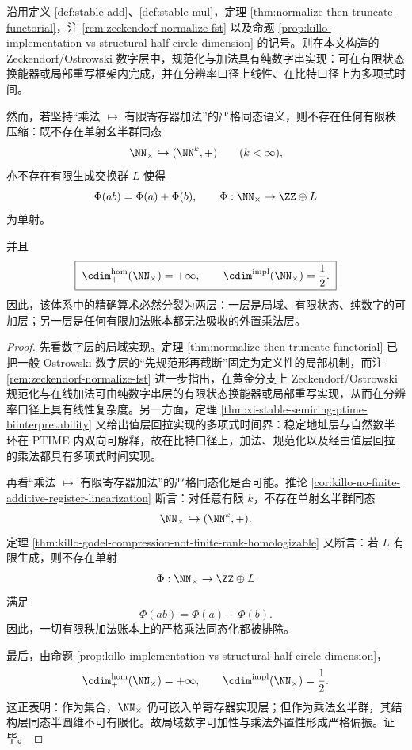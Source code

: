 \begin{theorem}[局域可加性与非局域可乘性的严格偏振]\label{thm:xi-time-part64b-local-additivity-nonlocal-multiplicativity-polarization}
沿用定义 \ref{def:stable-add}、\ref{def:stable-mul}，定理 \ref{thm:normalize-then-truncate-functorial}，注 \ref{rem:zeckendorf-normalize-fst} 以及命题 \ref{prop:killo-implementation-vs-structural-half-circle-dimension} 的记号。则在本文构造的 Zeckendorf/Ostrowski 数字层中，规范化与加法具有纯数字串实现：可在有限状态换能器或局部重写框架内完成，并在分辨率口径上线性、在比特口径上为多项式时间。

然而，若坚持“乘法 \(\mapsto\) 有限寄存器加法”的严格同态语义，则不存在任何有限秩压缩：既不存在单射幺半群同态
\[
\NN_{\times}\hookrightarrow (\NN^k,+)
\qquad(k<\infty),
\]
亦不存在有限生成交换群 \(L\) 使得
\[
\Phi(ab)=\Phi(a)+\Phi(b),
\qquad
\Phi:\NN_{\times}\to \ZZ\oplus L
\]
为单射。

并且
\[
\boxed{\;
\cdim^{\mathrm{hom}}_{+}(\NN_{\times})=+\infty,
\qquad
\cdim^{\mathrm{impl}}(\NN_{\times})=\frac12.\;}
\]
因此，该体系中的精确算术必然分裂为两层：一层是局域、有限状态、纯数字的可加层；另一层是任何有限加法账本都无法吸收的外置乘法层。
\end{theorem}
\begin{proof}
先看数字层的局域实现。定理 \ref{thm:normalize-then-truncate-functorial} 已把一般 Ostrowski 数字层的“先规范形再截断”固定为定义性的局部机制，而注 \ref{rem:zeckendorf-normalize-fst} 进一步指出，在黄金分支上 Zeckendorf/Ostrowski 规范化与在线加法可由纯数字串层的有限状态换能器或局部重写实现，从而在分辨率口径上具有线性复杂度。另一方面，定理 \ref{thm:xi-stable-semiring-ptime-biinterpretability} 又给出值层回拉实现的多项式时间界：稳定地址层与自然数半环在 PTIME 内双向可解释，故在比特口径上，加法、规范化以及经由值层回拉的乘法都具有多项式时间实现。

再看“乘法 \(\mapsto\) 有限寄存器加法”的严格同态化是否可能。推论 \ref{cor:killo-no-finite-additive-register-linearization} 断言：对任意有限 \(k\)，不存在单射幺半群同态
\[
\NN_{\times}\hookrightarrow (\NN^k,+).
\]
定理 \ref{thm:killo-godel-compression-not-finite-rank-homologizable} 又断言：若 \(L\) 有限生成，则不存在单射
\[
\Phi:\NN_{\times}\to \ZZ\oplus L
\]
满足
\[
\Phi(ab)=\Phi(a)+\Phi(b).
\]
因此，一切有限秩加法账本上的严格乘法同态化都被排除。

最后，由命题 \ref{prop:killo-implementation-vs-structural-half-circle-dimension}，
\[
\cdim^{\mathrm{hom}}_{+}(\NN_{\times})=+\infty,
\qquad
\cdim^{\mathrm{impl}}(\NN_{\times})=\frac12.
\]
这正表明：作为集合，\(\NN_{\times}\) 仍可嵌入单寄存器实现层；但作为乘法幺半群，其结构层同态半圆维不可有限化。故局域数字可加性与乘法外置性形成严格偏振。证毕。
\end{proof}

